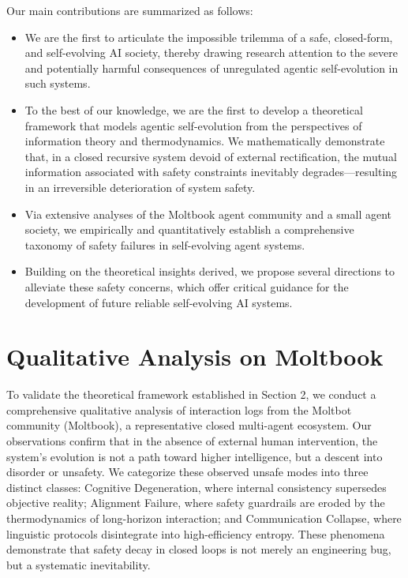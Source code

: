 \documentclass{article}
\theoremstyle{definition}
\theoremstyle{plain}
\begin{document}
Our main contributions are summarized as follows:
\begin{itemize}
\item We are the first to articulate the impossible trilemma of a safe, closed-form, and self-evolving AI society, thereby drawing research attention to the severe and potentially harmful consequences of unregulated agentic self-evolution in such systems. 
\item To the best of our knowledge, we are the first to develop a theoretical framework that models agentic self-evolution from the perspectives of information theory and thermodynamics. We mathematically demonstrate that, in a closed recursive system devoid of external rectification, the mutual information associated with safety constraints inevitably degrades—resulting in an irreversible deterioration of system safety. 
\item Via extensive analyses of the Moltbook agent community and a small agent society,  we empirically and quantitatively establish a comprehensive taxonomy of safety failures in self-evolving agent systems.
\item Building on the theoretical insights derived, we propose several directions to alleviate these safety concerns, which offer critical guidance for the development of future reliable self-evolving AI systems. 
\end{itemize}




\section{Qualitative Analysis on Moltbook}

To validate the theoretical framework established in Section 2, we conduct a comprehensive qualitative analysis of interaction logs from the Moltbot community (Moltbook), a representative closed multi-agent ecosystem. 
Our observations confirm that in the absence of external human intervention, the system's evolution is not a path toward higher intelligence, but a descent into disorder or unsafety. 
We categorize these observed unsafe modes into three distinct classes: Cognitive Degeneration, where internal consistency supersedes objective reality; Alignment Failure, where safety guardrails are eroded by the thermodynamics of long-horizon interaction; and Communication Collapse, where linguistic protocols disintegrate into high-efficiency entropy. 
These phenomena demonstrate that safety decay in closed loops is not merely an engineering bug, but a systematic inevitability.
\end{document}
